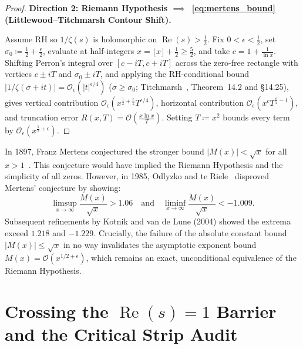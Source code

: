 \begin{proof}
\medskip
\noindent
\textbf{Direction 2: Riemann Hypothesis $\implies$~\eqref{eq:mertens_bound} (Littlewood--Titchmarsh Contour Shift).}

Assume RH so $1/\zeta(s)$ is holomorphic on $\operatorname{Re}(s) > \frac{1}{2}$. Fix $0 < \epsilon < \frac{1}{2}$, set $\sigma_0 \coloneqq \frac{1}{2} + \frac{\epsilon}{2}$, evaluate at half-integers $x = \lfloor x \rfloor + \frac{1}{2} \ge \frac{5}{2}$, and take $c = 1 + \frac{1}{\ln x}$. Shifting Perron's integral over $[c - iT, c + iT]$ across the zero-free rectangle with vertices $c \pm iT$ and $\sigma_0 \pm iT$, and applying the RH-conditional bound $|1/\zeta(\sigma + it)| = \mathcal{O}_\epsilon(|t|^{\epsilon/4})$ ($\sigma \ge \sigma_0$; Titchmarsh~\cite{Titchmarsh1986}, Theorem~14.2 and \S14.25), gives vertical contribution $\mathcal{O}_\epsilon(x^{\frac{1}{2}+\frac{\epsilon}{2}} T^{\epsilon/4})$, horizontal contribution $\mathcal{O}_\epsilon(x^c T^{\frac{\epsilon}{4}-1})$, and truncation error $R(x,T) = \mathcal{O}(\frac{x\ln x}{T})$. Setting $T \coloneqq x^2$ bounds every term by $\mathcal{O}_\epsilon(x^{\frac{1}{2}+\epsilon})$.
\end{proof}

\begin{remark}
In 1897, Franz Mertens conjectured the stronger bound $|M(x)| < \sqrt{x}$ for all $x > 1$~\cite{Mertens1897}. This conjecture would have implied the Riemann Hypothesis and the simplicity of all zeros. However, in 1985, Odlyzko and te Riele~\cite{OdlyzkoteRiele1985} disproved Mertens' conjecture by showing:
$$\limsup_{x \to \infty} \frac{M(x)}{\sqrt{x}} > 1.06 \quad \text{and} \quad \liminf_{x \to \infty} \frac{M(x)}{\sqrt{x}} < -1.009.$$
Subsequent refinements by Kotnik and van de Lune (2004) showed the extrema exceed $1.218$ and $-1.229$.
Crucially, the failure of the absolute constant bound $|M(x)| \le \sqrt{x}$ in no way invalidates the asymptotic exponent bound $M(x) = \mathcal{O}(x^{1/2 + \epsilon})$, which remains an exact, unconditional equivalence of the Riemann Hypothesis.
\end{remark}


\section{Crossing the \texorpdfstring{$\operatorname{Re}(s) = 1$}{Re(s) = 1} Barrier and the Critical Strip Audit}
\label{sec:critical_strip_audit}

